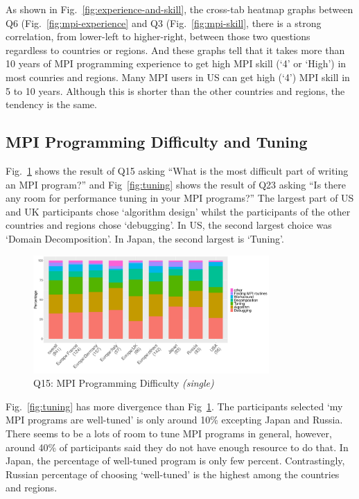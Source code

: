 \documentclass[conference,10pt,letterpaper]{IEEEtran}
\def\myquote#1{`#1'}
\begin{document}
As shown in Fig.~\ref{fig:experience-and-skill}, the cross-tab heatmap
graphs between Q6 (Fig.~\ref{fig:mpi-experience} and Q3
(Fig.~\ref{fig:mpi-skill}, there is a strong correlation, from
lower-left to higher-right, between those
two questions regardless to countries or regions. And these graphs
tell that it takes more than 10 years of MPI programming experience to
get high MPI skill (\myquote{4} or \myquote{High}) in most counries
and regions. Many MPI users in US can get high (\myquote{4})
MPI skill in 5 to 10 years. Although this is shorter than the other
countries and regions, the tendency is the same.

\subsection{MPI Programming Difficulty and Tuning}

Fig.~\ref{fig:difficulty} shows the result of Q15 asking ``What is the
most difficult part of writing an MPI program?'' and
Fig~\ref{fig:tuning} shows the result of Q23 asking ``Is there any
room for performance tuning in your MPI programs?'' The largest part
of US and UK participants chose \myquote{algorithm design} whilst the
participants of the other countries and regions chose
\myquote{debugging}. In US, the second largest choice was
\myquote{Domain Decomposition}. In Japan, the second largest is
\myquote{Tuning}. 

\begin{figure}[htb]
\begin{center}
\includegraphics[width=9cm]{R-scripts/Q15.pdf}
\caption{Q15: MPI Programming Difficulty {\it(single)}}
\label{fig:difficulty}
\end{center}
\end{figure}

Fig.~\ref{fig:tuning} has more divergence than
Fig~\ref{fig:difficulty}. The participants selected \myquote{my MPI
  programs are well-tuned} is only around 10\% excepting Japan and
Russia. There seems to be a lots of room to tune MPI programs in
general, however, around 40\% of participants said they do not have
enough resource to do that. In Japan, the percentage of well-tuned
program is only few percent. Contrastingly, Russian percentage of
choosing \myquote{well-tuned} is the highest among the countries and
regions. 
\end{document}
